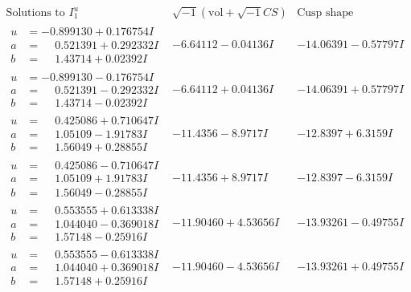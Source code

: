 \documentclass[1p]{elsarticle_modified}
\theoremstyle{definition}
\newcommand{\I}{\sqrt{-1}}
\begin{document}
$$\begin{array}{c|c|c}  
\text{Solutions to }I^u_{1}& \I (\text{vol} + \sqrt{-1}CS) & \text{Cusp shape}\\
 \hline 
\begin{aligned}
u &= -0.899130 + 0.176754 I \\
a &= \phantom{-}0.521391 + 0.292332 I \\
b &= \phantom{-}1.43714 + 0.02392 I\end{aligned}
 & -6.64112 - 0.04136 I & -14.06391 - 0.57797 I \\ \hline\begin{aligned}
u &= -0.899130 - 0.176754 I \\
a &= \phantom{-}0.521391 - 0.292332 I \\
b &= \phantom{-}1.43714 - 0.02392 I\end{aligned}
 & -6.64112 + 0.04136 I & -14.06391 + 0.57797 I \\ \hline\begin{aligned}
u &= \phantom{-}0.425086 + 0.710647 I \\
a &= \phantom{-}1.05109 - 1.91783 I \\
b &= \phantom{-}1.56049 + 0.28855 I\end{aligned}
 & -11.4356 - 8.9717 I & -12.8397 + 6.3159 I \\ \hline\begin{aligned}
u &= \phantom{-}0.425086 - 0.710647 I \\
a &= \phantom{-}1.05109 + 1.91783 I \\
b &= \phantom{-}1.56049 - 0.28855 I\end{aligned}
 & -11.4356 + 8.9717 I & -12.8397 - 6.3159 I \\ \hline\begin{aligned}
u &= \phantom{-}0.553555 + 0.613338 I \\
a &= \phantom{-}1.044040 - 0.369018 I \\
b &= \phantom{-}1.57148 - 0.25916 I\end{aligned}
 & -11.90460 + 4.53656 I & -13.93261 - 0.49755 I \\ \hline\begin{aligned}
u &= \phantom{-}0.553555 - 0.613338 I \\
a &= \phantom{-}1.044040 + 0.369018 I \\
b &= \phantom{-}1.57148 + 0.25916 I\end{aligned}
 & -11.90460 - 4.53656 I & -13.93261 + 0.49755 I \\ \hline\begin{aligned}

\end{aligned}
\end{array}$$
\end{document}
